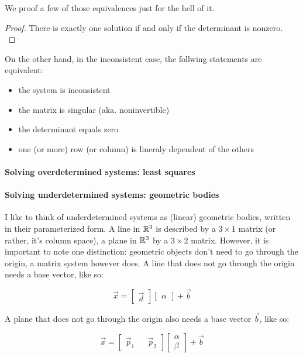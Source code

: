 We proof a few of those equivalences just for the hell of it. 

\begin{proof} There is exactly one solution if and only if the determinant is nonzero. \\
\end{proof}

On the other hand, in the inconsistent case, the follwing statements are equivalent:

\begin{itemize}
    \item the system is inconsistent
    \item the matrix is singular (aka. noninvertible)
    \item the determinant equals zero
    \item one (or more) row (or column) is lineraly dependent of the others
\end{itemize}

\paragraph{Solving overdetermined systems: least squares}


\paragraph{Solving underdetermined systems: geometric bodies}
I like to think of underdetermined systems as (linear) geometric bodies, written in their parameterized form. A line in $\mathbb{R}^3$ is described by a $3 \times 1$ matrix (or rather, it's column space), a plane in $\mathbb{R}^3$ by a $3 \times 2$ matrix. However, it is important to note one distinction: geometric objects don't need to go through the origin, a matrix system however does. A line that does not go through the origin needs a base vector, like so: 

$$\vec{x} = \begin{bmatrix} \vec{d} \end{bmatrix} \begin{bmatrix} \alpha \end{bmatrix} + \vec{b}$$ 

A plane that does not go through the origin also needs a base vector $\vec{b}$, like so: 

$$\vec{x} = \begin{bmatrix} \vec{p}_1 && \vec{p}_2 \end{bmatrix} \begin{bmatrix} \alpha  \\ \beta \end{bmatrix} + \vec{b}  $$



